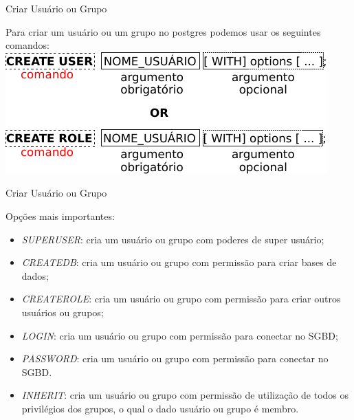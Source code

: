 \documentclass[xcolor=x11names,compress]{beamer}
\begin{document}
\begin{frame}{Criar Usuário ou Grupo}

Para criar um usuário ou um grupo no postgres podemos usar os seguintes comandos:\\[5mm]

\centering \includegraphics[keepaspectratio,width=\textwidth]{create_user}

\end{frame}

\begin{frame}[allowframebreaks]{Criar Usuário ou Grupo}

Opções mais importantes:

\begin{itemize}

\itemsep 5mm

\item \textit{SUPERUSER}: cria um usuário ou grupo com poderes de super usuário;

\item \textit{CREATEDB}: cria um usuário ou grupo com permissão para criar bases de dados;

\item \textit{CREATEROLE}: cria um usuário ou grupo com permissão para criar outros usuários ou grupos;

\item \textit{LOGIN}: cria um usuário ou grupo com permissão para conectar no SGBD;

\item \textit{PASSWORD}: cria um usuário ou grupo com permissão para conectar no SGBD.

\item \textit{INHERIT}: cria um usuário ou grupo com permissão de utilização de todos os privilégios dos grupos, o qual o dado usuário ou grupo é membro.

\end{itemize}

\end{frame}
\end{document}
